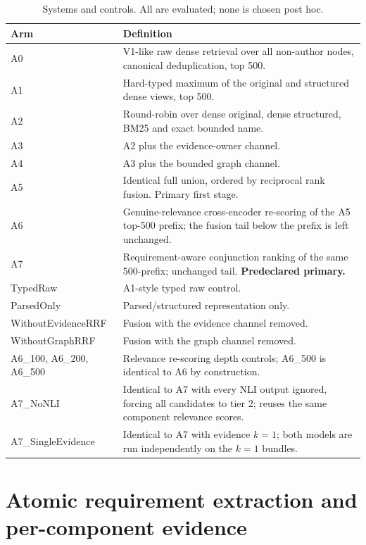 \documentclass[11pt,a4paper]{article}
\begin{document}
\begin{table}[htbp]
\centering
\footnotesize
\caption{Systems and controls. All are evaluated; none is chosen post hoc.}
\label{tab:arms}
\begin{tabular}{@{}p{3.7cm}p{11.4cm}@{}}
\toprule
Arm & Definition \\
\midrule
A0 & V1-like raw dense retrieval over all non-author nodes, canonical deduplication, top 500. \\
A1 & Hard-typed maximum of the original and structured dense views, top 500. \\
A2 & Round-robin over dense original, dense structured, BM25 and exact bounded name. \\
A3 & A2 plus the evidence-owner channel. \\
A4 & A3 plus the bounded graph channel. \\
A5 & Identical full union, ordered by reciprocal rank fusion. Primary first stage. \\
A6 & Genuine-relevance cross-encoder re-scoring of the A5 top-500 prefix; the fusion tail below the prefix is left unchanged. \\
A7 & Requirement-aware conjunction ranking of the same 500-prefix; unchanged tail. \textbf{Predeclared primary.} \\
\midrule
TypedRaw & A1-style typed raw control. \\
ParsedOnly & Parsed/structured representation only. \\
WithoutEvidenceRRF & Fusion with the evidence channel removed. \\
WithoutGraphRRF & Fusion with the graph channel removed. \\
A6\_100, A6\_200, A6\_500 & Relevance re-scoring depth controls; A6\_500 is identical to A6 by construction. \\
A7\_NoNLI & Identical to A7 with every NLI output ignored, forcing all candidates to tier 2; reuses the same component relevance scores. \\
A7\_SingleEvidence & Identical to A7 with evidence $k=1$; both models are run independently on the $k=1$ bundles. \\
\bottomrule
\end{tabular}
\end{table}

\section{Atomic requirement extraction and per-component evidence}
\label{sec:requirements}
\end{document}
